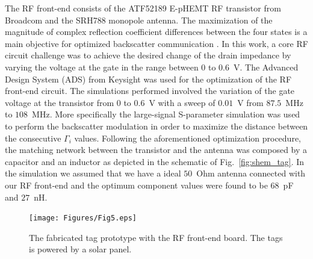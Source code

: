 \documentclass[journal]{IEEEtran}
\begin{document}
The RF front-end consists of the ATF52189 E-pHEMT RF transistor from Broadcom \cite{ATF52189} and the SRH788 monopole antenna.
%
The maximization of the magnitude of  complex reflection coefficient
differences between the four states is a main objective  for optimized backscatter communication \cite{BleDimSah:j10}.
%
In this work, a core RF circuit challenge was to achieve the desired change of the drain impedance by varying the voltage at the gate in the range between $0$ to $0.6$~V. 
%
The Advanced Design System (ADS) from Keysight was used for the optimization of the RF front-end circuit. 
%
The simulations  performed involved the variation of the gate voltage at the transistor from $0$ to $0.6$~V with a sweep of $0.01$~V from $87.5$~MHz to $108$~MHz.
%
More specifically  the large-signal S-parameter simulation was used to perform the backscatter modulation in order to maximize the distance between the consecutive $\Gamma_i$ values.
%
Following the aforementioned optimization procedure, the matching network between the transistor and the antenna was composed by a capacitor and an inductor as depicted in the schematic of Fig.~\ref{fig:shem_tag}.
%
In the simulation  we assumed that we have a ideal $50$~Ohm antenna connected with our RF front-end and
the optimum  component values were found to be $68$~pF and $27$~nH. 
\begin{figure}[t]
\centering
\texttt{[image: Figures/Fig5.eps]}
\caption{The fabricated tag prototype  with  the RF front-end  board. The tags is powered by a solar panel.}
\label{fig:fabricated}
\end{figure}
\end{document}
